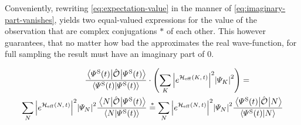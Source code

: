 Conveniently, rewriting \autoref{eq:expectation-value} in the manner of \autoref{eq:imaginary-part-vanishes}, yields two equal-valued expressions for the value of the observation that are complex conjugations $\ast$ of each other.
This however guarantees, that no matter how \glqq bad\grqq{} the \psiOfT[\schroedingerPicture] approximates the real wave-function, for full sampling the result must have an imaginary part of 0.

\begin{equation}
    \label{eq:imaginary-part-vanishes}
    \begin{split}
        \frac{\bracketHelper{\psiOfT[\schroedingerPicture]}{\ObservableOp}{\psiOfT[\schroedingerPicture]}}{\braketHelper{\psiOfT[\schroedingerPicture]}{\psiOfT[\schroedingerPicture]}}
        &\cdot
        \left(
            \lsum[K] \absSquare{e^{\HeffOft[K]}} \absSquare{\psiN[K]} 
        \right) =\\
        \lsum[N]
        \absSquare{e^{\HeffOft}} \absSquare{\psiN} 
        \frac{\bracketHelper{N}{\ObservableOp}{\psiOfT[\schroedingerPicture]}}{\braketHelper{N}{\psiOfT[\schroedingerPicture]}}
        &\stackrel{\ast}{=}
        \lsum[N]
        \absSquare{e^{\HeffOft}} \absSquare{\psiN} 
        \frac{\bracketHelper{\psiOfT[\schroedingerPicture]}{\ObservableOp}{N}}{\braketHelper{\psiOfT[\schroedingerPicture]}{N}}
    \end{split}
\end{equation}